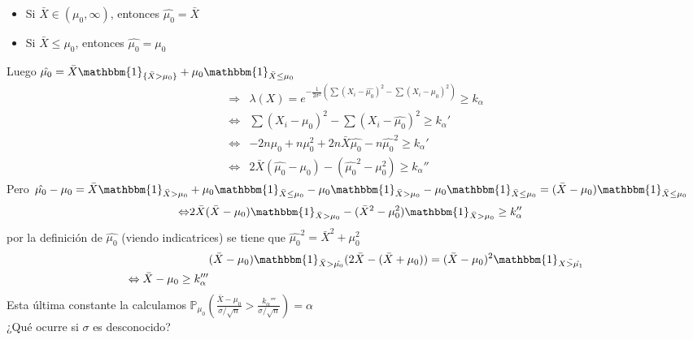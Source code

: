 \documentclass[10pt]{article}
\theoremstyle{plain}
\theoremstyle{definition}
\begin{document}
\begin{itemize}
\item Si $\bar{X} \in (\mu_{0},\infty)$, entonces $\hat{\mu_{0}} = \bar{X}$
\item Si $\bar{X}\le \mu_{0}$, entonces $\hat{\mu_{0}}=\mu_{0}$
\end{itemize}
Luego $\hat{\mu_{0}} = \bar{X}\mathbbm{1}_{\{\bar{X}>\mu_{0}\}}+ \mu_{0} \mathbbm{1}_{\bar{X}\le \mu_{0}}$ 
\begin{align*}
\Rightarrow &\lambda(X) = e^{-\frac{1}{2\sigma^2}\left(\sum (X_{i}-\hat{\mu_{0}})^2- \sum (X_{i}-\mu_{0})^2\right)}\ge k_{\alpha}\\
\Leftrightarrow & \sum (X_{i}-\mu_{0})^2 - \sum (X_{i}-\hat{\mu_{0}})^2 \ge k_{\alpha}'\\
\Leftrightarrow &-2n\mu_{0} + n\mu_{0}^2 +2n\bar{X}\hat{\mu_{0}} - n \hat{\mu_{0}}^2 \ge k_{\alpha}'\\
\Leftrightarrow &2\bar{X}(\hat{\mu_{0}}-\mu_{0}) - (\hat{\mu_{0}}^2-\mu_{0}^2) \ge k_{\alpha}''
\end{align*}
Pero $\hat{\mu_{0}} - \mu_{0} = \bar{X}\mathbbm{1}_{\bar{X}>\mu_{0}} + \mu_{0}\mathbbm{1}_{\bar{X}\le \mu_{0}} - \mu_{0}\mathbbm{1}_{\bar{X}>\mu_{0}} - \mu_{0}\mathbbm{1}_{\bar{X}\le \mu_{0}} = (\bar{X}-\mu_{0})\mathbbm{1}_{\bar{X}\le \mu_{0}}$
\begin{align*}
\Leftrightarrow & 2\bar{X}(\bar{X}-\mu_{0})\mathbbm{1}_{\bar{X}>\mu_{0}} - (\bar{X}^2-\mu_{0}^2)\mathbbm{1}_{\bar{X}>\mu_{0}} \ge k_{\alpha}''
\end{align*}
por la definición de $\hat{\mu_{0}}$ (viendo indicatrices) se tiene que $\hat{\mu_{0}}^2 = \bar{X}^2 + \mu_{0}^2$
\begin{align*}
&(\bar{X}-\mu_{0})\mathbbm{1}_{\bar{X}>\hat{\mu_{0}}}(2\bar{X}- (\bar{X}+\mu_{0})) = (\bar{X}-\mu_{0})^2\mathbbm{1}_{\bar{X>\hat{\mu_{1}}}}\\
\Leftrightarrow \bar{X}-\mu_{0} \ge k_{\alpha}'''
\end{align*}
Esta última constante la calculamos $\mathbb{P}_{\mu_{0}}\left(\frac{\bar{X}-\mu_{0}}{\sigma/\sqrt{n}}>\frac{k_{\alpha}'''}{\sigma/\sqrt{n}}\right)= \alpha$\\

¿Qué ocurre si $\sigma$ es desconocido?\\
\end{document}
